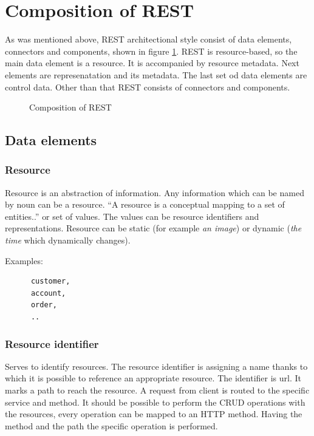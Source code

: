 \section{Composition of REST}
\label{sec:rest-composition}
As was mentioned above, REST architectional style consist of data elements, connectors and components, shown in figure \ref{fig:composition-rest}. REST is resource-based, so the main data element is a resource. It is accompanied by resource metadata. Next elements are represenatation and its metadata. The last set od data elements are control data. Other than that REST consists of connectors and components.

\begin{figure}[htp] 
\caption{Composition of REST}
\label{fig:composition-rest}
\end{figure} 

\subsection{Data elements}
\subsubsection{Resource}
  Resource is an abstraction of information. Any information which can be named by noun can be a resource. ``A resource is a conceptual mapping to a set of entities..'' \cite{fielding} or set of values. The values can be resource identifiers and representations.
  Resource can be static (for example \emph{an image}) or dynamic (\emph{the time} which dynamically changes).
  
  Examples:
  \begin{center} 
  \begin{lstlisting}
      customer, 
      account, 
      order, 
      ..
  \end{lstlisting} 
  \end{center}

\subsubsection{Resource identifier}
  Serves to identify resources. The resource identifier is assigning a name thanks to which it is possible to reference an appropriate resource. The identifier is \gls{url}. It marks a path to reach the resource. A request from client is routed to the specific service and method.
It should be possible to perform the \gls{CRUD} operations with the resources, every operation can be mapped to an HTTP method. Having the method and the path the specific operation is performed.

